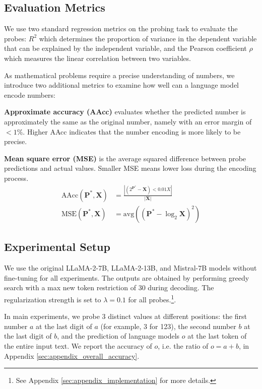 \documentclass[11pt]{article}
\begin{document}
\subsection{Evaluation Metrics}
\label{ssec:metric}
We use two standard regression metrics on the probing task to evaluate the probes: $R^2$ which determines the proportion of variance in the dependent variable that can be explained by the independent variable, and the Pearson coefficient $\rho$ which measures the linear correlation between two variables.

As mathematical problems require a precise understanding of numbers, we introduce two additional metrics to examine how well can a language model encode numbers:

\textbf{Approximate accuracy (AAcc)} evaluates whether the predicted number is approximately the same as the original number, namely with an error margin of $<1\%$. 
Higher AAcc indicates that the number encoding is more likely to be precise.

\textbf{Mean square error (MSE)} is the average squared difference between probe predictions and actual values. 
Smaller MSE means lower loss during the encoding process.
\begin{align}
    \text{AAcc}(\mathbf{P}^*, \mathbf{X}) &= \frac{|(2^{\mathbf{P}^*} - \mathbf{X}) < 0.01X|}{|\mathbf{X}|} \\
    \text{MSE}(\mathbf{P}^*, \mathbf{X}) &= \text{avg}((\mathbf{P}^*-\log_{2}\mathbf{X})^2)
\end{align}


\subsection{Experimental Setup}
We use the original LLaMA-2-7B, LLaMA-2-13B, and Mistral-7B models without fine-tuning for all experiments.
The outputs are obtained by performing greedy search with a max new token restriction of 30 during decoding.
The regularization strength is set to $\lambda = 0.1$ for all probes.\footnote{See Appendix \ref{sec:appendix_implementation} for more details.}.

In main experiments, we probe 3 distinct values at different positions: the first number $a$ at the last digit of $a$ (for example, 3 for 123), the second number $b$ at the last digit of $b$, and the prediction of language models $o$ at the last token of the entire input text. 
We report the accuracy of $o$, i.e. the ratio of $o = a+b$, in Appendix \ref{sec:appendix_overall_accuracy}.
\end{document}

